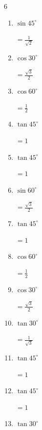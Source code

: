 \begin{multicols}{6}
\begin{enumerate}
        $\displaystyle =\sqrt{3}$

  \item $\displaystyle \sin{45^\circ}$

        $\displaystyle =\frac{1}{\sqrt{2}}$

  \item $\displaystyle \cos{30^\circ}$

        $\displaystyle =\frac{\sqrt{3}}{2}$

  \item $\displaystyle \cos{60^\circ}$

        $\displaystyle =\frac{1}{2}$

  \item $\displaystyle \tan{45^\circ}$

        $\displaystyle =1$

  \item $\displaystyle \tan{45^\circ}$

        $\displaystyle =1$

  \item $\displaystyle \sin{60^\circ}$

        $\displaystyle =\frac{\sqrt{3}}{2}$

  \item $\displaystyle \tan{45^\circ}$

        $\displaystyle =1$

  \item $\displaystyle \cos{60^\circ}$

        $\displaystyle =\frac{1}{2}$

\columnbreak %

\resetques

  \item $\displaystyle \cos{30^\circ}$

        $\displaystyle =\frac{\sqrt{3}}{2}$

  \item $\displaystyle \tan{30^\circ}$

        $\displaystyle =\frac{1}{\sqrt{3}}$

  \item $\displaystyle \tan{45^\circ}$

        $\displaystyle =1$

  \item $\displaystyle \tan{45^\circ}$

        $\displaystyle =1$

  \item $\displaystyle \tan{30^\circ}$


\end{enumerate}
\end{multicols}

